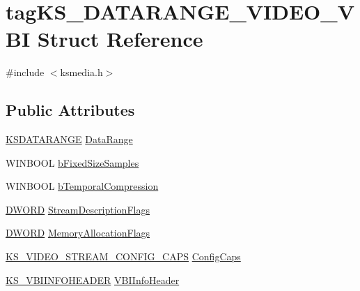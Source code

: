 \hypertarget{structtag_k_s___d_a_t_a_r_a_n_g_e___v_i_d_e_o___v_b_i}{}\section{tag\+K\+S\+\_\+\+D\+A\+T\+A\+R\+A\+N\+G\+E\+\_\+\+V\+I\+D\+E\+O\+\_\+\+V\+BI Struct Reference}
\label{structtag_k_s___d_a_t_a_r_a_n_g_e___v_i_d_e_o___v_b_i}


{\ttfamily \#include $<$ksmedia.\+h$>$}

\subsection*{Public Attributes}
\begin{DoxyCompactItemize}
\item 
\hyperlink{ks_8h_a1ea8bc535eaf96036403dc325623b469}{K\+S\+D\+A\+T\+A\+R\+A\+N\+GE} \hyperlink{structtag_k_s___d_a_t_a_r_a_n_g_e___v_i_d_e_o___v_b_i_a78c124deac3935b037ba0483a811c391}{Data\+Range}
\item 
W\+I\+N\+B\+O\+OL \hyperlink{structtag_k_s___d_a_t_a_r_a_n_g_e___v_i_d_e_o___v_b_i_ad87fe9a83f2933dd8c7df1b54348d0cb}{b\+Fixed\+Size\+Samples}
\item 
W\+I\+N\+B\+O\+OL \hyperlink{structtag_k_s___d_a_t_a_r_a_n_g_e___v_i_d_e_o___v_b_i_a0239b47973be20e6aabb4dcb9ddad293}{b\+Temporal\+Compression}
\item 
\hyperlink{mapinls_8h_ad342ac907eb044443153a22f964bf0af}{D\+W\+O\+RD} \hyperlink{structtag_k_s___d_a_t_a_r_a_n_g_e___v_i_d_e_o___v_b_i_abec13033b267898801e45abc385b31a7}{Stream\+Description\+Flags}
\item 
\hyperlink{mapinls_8h_ad342ac907eb044443153a22f964bf0af}{D\+W\+O\+RD} \hyperlink{structtag_k_s___d_a_t_a_r_a_n_g_e___v_i_d_e_o___v_b_i_ab0a8f5fa54e4f450c1a50cb062f7f9f4}{Memory\+Allocation\+Flags}
\item 
\hyperlink{ksmedia_8h_a6206e1a832fffa713842974c34128ade}{K\+S\+\_\+\+V\+I\+D\+E\+O\+\_\+\+S\+T\+R\+E\+A\+M\+\_\+\+C\+O\+N\+F\+I\+G\+\_\+\+C\+A\+PS} \hyperlink{structtag_k_s___d_a_t_a_r_a_n_g_e___v_i_d_e_o___v_b_i_ac3f4c4fdef56e95b4f4606289bf8d33d}{Config\+Caps}
\item 
\hyperlink{ksmedia_8h_a8d02c7af80e7864a38e331c8c42d6fa2}{K\+S\+\_\+\+V\+B\+I\+I\+N\+F\+O\+H\+E\+A\+D\+ER} \hyperlink{structtag_k_s___d_a_t_a_r_a_n_g_e___v_i_d_e_o___v_b_i_ac50cf64b37c01288cc47bfeba530c718}{V\+B\+I\+Info\+Header}
\end{DoxyCompactItemize}



